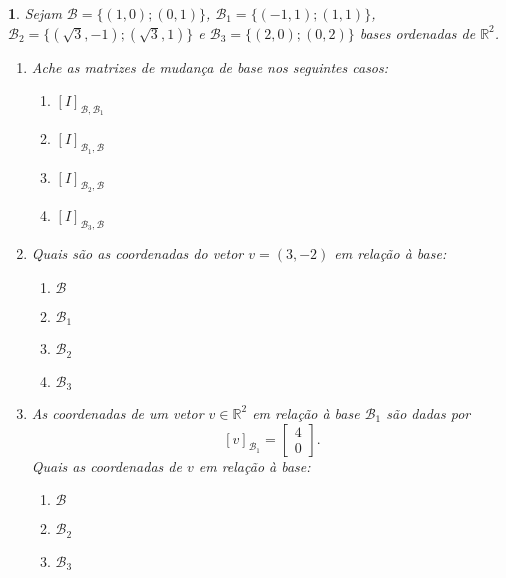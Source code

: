 \documentclass[12pt]{exam}
\newtheorem{exercicio}{}
\newcommand{\real}{\mathbb{R}}
\begin{document}
\begin{exercicio}
  Sejam $\mathcal{B} = \{(1,0);(0,1)\}$, $\mathcal{B}_1 = \{(-1,1);(1,1)\}$, $\mathcal{B}_2 = \{(\sqrt{3},-1);(\sqrt{3},1)\}$ e $\mathcal{B}_3 = \{(2,0);(0,2)\}$ bases ordenadas de $\real^2$.
  \begin{enumerate}[label=({\alph*})]
    \item Ache as matrizes de mudan\c{c}a de base nos seguintes casos:
    \begin{enumerate}[label=({\roman*})]
      \item $[I]_{\mathcal{B},\mathcal{B}_1}$
      \item $[I]_{\mathcal{B}_1,\mathcal{B}}$
      \item $[I]_{\mathcal{B}_2,\mathcal{B}}$
      \item $[I]_{\mathcal{B}_3,\mathcal{B}}$
    \end{enumerate}
    \item Quais s\~ao as coordenadas do vetor $v = (3,-2)$ em rela\c{c}\~ao \`a base:
    \begin{enumerate}[label=({\roman*})]
      \item $\mathcal{B}$
      \item $\mathcal{B}_1$
      \item $\mathcal{B}_2$
      \item $\mathcal{B}_3$
    \end{enumerate}
    \item As coordenadas de um vetor $v \in \real^2$ em rela\c{c}\~ao \`a base $\mathcal{B}_1$ s\~ao dadas por
    \[
      [v]_{\mathcal{B}_1} = \begin{bmatrix}
        4\\0
      \end{bmatrix}.
    \]
    Quais as coordenadas de $v$ em rela\c{c}\~ao \`a base:
    \begin{enumerate}[label=({\roman*})]
      \item $\mathcal{B}$
      \item $\mathcal{B}_2$
      \item $\mathcal{B}_3$
    \end{enumerate}
  \end{enumerate}
\end{exercicio}
\end{document}

